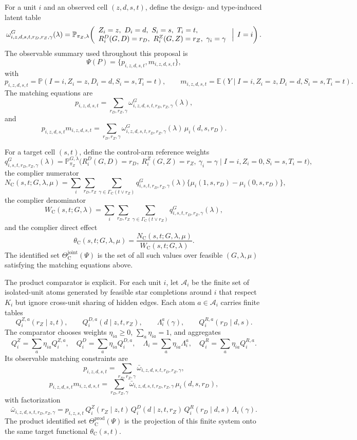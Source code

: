 \documentclass[11pt]{article}
\newcommand{\E}{\mathbb{E}}
\renewcommand{\Pr}{\mathbb{P}}
\newcommand{\calA}{\mathcal{A}}
\newcommand{\PsiObs}{\Psi}
\theoremstyle{definition}
\theoremstyle{plain}
\theoremstyle{remark}
\begin{document}
For a unit \(i\) and an observed cell \((z,d,s,t)\), define the design- and
type-induced latent table
\[
\omega^G_{i,z,d,s,t,r_D,r_Z,\gamma}(\lambda)
 =
\Pr_{\pi_Z,\lambda}\!\left(
\begin{array}{l}
Z_i=z,\ D_i=d,\ S_i=s,\ T_i=t,\\
R_i^D(G,D)=r_D,\ R_i^Z(G,Z)=r_Z,\ \gamma_i=\gamma
\end{array}
\Bigm|\, I=i\right).
\]
The observable summary used throughout this proposal is
\[
\PsiObs(P)=\{p_{i,z,d,s,t},m_{i,z,d,s,t}\},
\]
with
\[
p_{i,z,d,s,t}=\Pr(I=i,Z_i=z,D_i=d,S_i=s,T_i=t),
\qquad
m_{i,z,d,s,t}=\E(Y\mid I=i,Z_i=z,D_i=d,S_i=s,T_i=t).
\]
The matching equations are
\[
p_{i,z,d,s,t}
=
\sum_{r_D,r_Z,\gamma}
\omega^G_{i,z,d,s,t,r_D,r_Z,\gamma}(\lambda),
\]
and
\[
p_{i,z,d,s,t}m_{i,z,d,s,t}
=
\sum_{r_D,r_Z,\gamma}
\omega^G_{i,z,d,s,t,r_D,r_Z,\gamma}(\lambda)\,
\mu_i(d,s,r_D).
\]

For a target cell \((s,t)\), define the control-arm reference weights
\[
q^G_{i,s,t,r_D,r_Z,\gamma}(\lambda)
=
\Pr^{G,\lambda}_{\pi_Z}
\bigl(
R_i^D(G,D)=r_D,\ R_i^Z(G,Z)=r_Z,\ \gamma_i=\gamma
\mid I=i,Z_i=0,S_i=s,T_i=t
\bigr),
\]
the complier numerator
\[
N_{\mathrm{C}}(s,t;G,\lambda,\mu)
=
\sum_i\sum_{r_D,r_Z}\sum_{\gamma\in\Gamma_{\mathrm{C}}(t\vee r_Z)}
q^G_{i,s,t,r_D,r_Z,\gamma}(\lambda)
\{\mu_i(1,s,r_D)-\mu_i(0,s,r_D)\},
\]
the complier denominator
\[
W_{\mathrm{C}}(s,t;G,\lambda)
=
\sum_i\sum_{r_D,r_Z}\sum_{\gamma\in\Gamma_{\mathrm{C}}(t\vee r_Z)}
q^G_{i,s,t,r_D,r_Z,\gamma}(\lambda),
\]
and the complier direct effect
\[
\theta_{\mathrm{C}}(s,t;G,\lambda,\mu)
=
\frac{N_{\mathrm{C}}(s,t;G,\lambda,\mu)}
{W_{\mathrm{C}}(s,t;G,\lambda)}.
\]
The identified set
\(\Theta_{\mathrm{C}}^{\mathrm{joint}}(\PsiObs)\) is the set of all such values
over feasible \((G,\lambda,\mu)\) satisfying the matching equations above.

The product comparator is explicit. For each unit \(i\), let \(\calA_i\) be the
finite set of isolated-unit atoms generated by feasible star completions around
\(i\) that respect \(K_i\) but ignore cross-unit sharing of hidden edges. Each
atom \(a\in\calA_i\) carries finite tables
\[
Q^{Z,a}_{i}(r_Z\mid z,t),\qquad
Q^{D,a}_{i}(d\mid z,t,r_Z),\qquad
\Lambda^{a}_{i}(\gamma),\qquad
Q^{R,a}_{i}(r_D\mid d,s).
\]
The comparator chooses weights \(\eta_{ia}\ge0\), \(\sum_a\eta_{ia}=1\), and
aggregates
\[
Q^Z_i=\sum_a\eta_{ia}Q^{Z,a}_{i},\quad
Q^D_i=\sum_a\eta_{ia}Q^{D,a}_{i},\quad
\Lambda_i=\sum_a\eta_{ia}\Lambda^{a}_{i},\quad
Q^R_i=\sum_a\eta_{ia}Q^{R,a}_{i}.
\]
Its observable matching constraints are
\[
p_{i,z,d,s,t}
=
\sum_{r_D,r_Z,\gamma}
\bar{\omega}_{i,z,d,s,t,r_D,r_Z,\gamma},
\]
\[
p_{i,z,d,s,t}m_{i,z,d,s,t}
=
\sum_{r_D,r_Z,\gamma}
\bar{\omega}_{i,z,d,s,t,r_D,r_Z,\gamma}\,
\mu_i(d,s,r_D),
\]
with factorization
\[
\bar{\omega}_{i,z,d,s,t,r_D,r_Z,\gamma}
=
p_{i,z,s,t}\,
Q^Z_i(r_Z\mid z,t)\,
Q^D_i(d\mid z,t,r_Z)\,
Q^R_i(r_D\mid d,s)\,
\Lambda_i(\gamma).
\]
The product identified set \(\Theta_{\mathrm{C}}^{\mathrm{prod}}(\PsiObs)\) is
the projection of this finite system onto the same target functional
\(\theta_{\mathrm{C}}(s,t)\).
\end{document}
